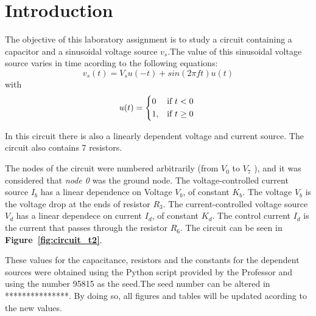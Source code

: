 \section{Introduction}
\label{sec:introduction}

\par The objective of this laboratory assignment is to study a circuit containing a capacitor and a sinusoidal voltage source $v_s$.The value of this sinusoidal voltage source varies in time acording to the following equations: 
\begin {equation}
	v_s( t)  = V_s u(-t) + sin( 2 \pi f t ) u( t)
	\label{eq:n1}
\end{equation}
 with 
\begin {equation}
	u( t ) =  
	\begin{cases*} 
	  0 & if $t < 0$ \\
	1, & if $t \geq 0$
	\end{cases*}
	\label{eq:n2}
\end{equation}

In this circuit there is also a linearly dependent voltage and current source. The circuit also contains 7 resistors.\par
The nodes of the circuit were numbered arbitrarily (from {\it$V_{0}$}  to {\it$V_{7}$} ), and it was considered that {\it node 0} was the ground node. The voltage-controlled current source {\it $I_b$} has a linear dependence on Voltage {\it $V_b$}, of constant {\it $K_b$}. The voltage {\it $V_b$} is the voltage drop at the ends of resistor {\it $R_3$}. The current-controlled voltage source {\it $V_d$} has a linear dependece on current {\it $I_d$}, of constant {\it $K_d$}. The control current {\it $I_d$} is the current that passes through the resistor {\it $R_6$}.
The circuit can be seen in \textbf{Figure~\ref{fig:circuit_t2}}.\par
These values for the capacitance, resistors and the constants for the dependent sources were obtained using the
Python script provided by the Professor 
and using the number 95815 as the seed.The seed number can be altered in ***************. By doing so, all figures and tables will be updated acording to the new values. \par


